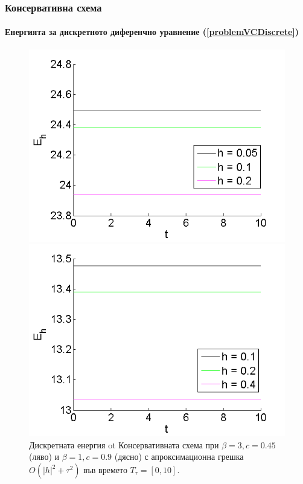 \documentclass{beamer}
\newcommand{\rf}[1]{(\ref{#1})}
\begin{document}

\begin{frame}

\frametitle{Консервативна схема}
\framesubtitle{Енергията за дискретното диференчно уравнение \rf{problemVCDiscrete}}

\begin{figure}[ht]\vspace{0.02cm}
	\begin{minipage}[b]{0.48\linewidth}
		\includegraphics[width=\linewidth]{../amitans/figures/Energy_EnergySave_bt3_c045_x3O.png}	
	\end{minipage}
	\begin{minipage}[b]{0.48\linewidth}
		 \includegraphics[width=\linewidth]{../amitans/figures/Energy_EnergySave_bt1_c090_x3O.png}
	\end{minipage}
\caption{Дискретната енергия ot Консервативната схема при $\beta=3,c=0.45$ (ляво) и $\beta=1,c=0.9$ (дясно) с апроксимационна грешка $O(|h|^2 + \tau^2)$ във времето $T_{\tau} = [0, 10]$.}
\label{EnOnly}
\end{figure}

\end{frame}
\end{document}
